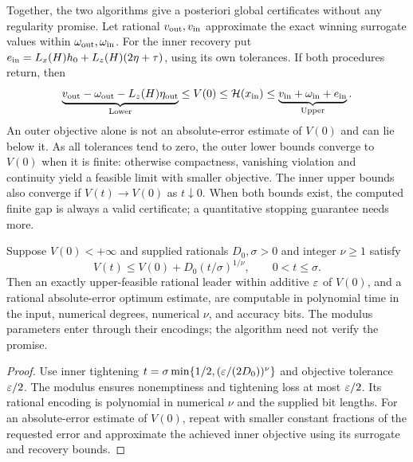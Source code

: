 Together, the two algorithms give a posteriori global certificates
without any regularity promise. Let rational $v_{\rm out},v_{\rm in}$ approximate
the exact winning surrogate values within $\omega_{\rm out},\omega_{\rm in}$.
For the inner recovery put
$e_{\rm in}=L_x(H)h_0+L_z(H)(2\eta+\tau)$, using its own tolerances.
If both procedures return, then
\begin{equation}\label{eq:accuracy-posterior}
 \underbrace{v_{\rm out}-\omega_{\rm out}-L_z(H)\eta_{\rm out}}_{\mathrm{Lower}}
 \le V(0)\le\mathcal H(x_{\rm in})\le
 \underbrace{v_{\rm in}+\omega_{\rm in}+e_{\rm in}}_{\mathrm{Upper}}.
\end{equation}
An outer objective
alone is not an absolute-error estimate of $V(0)$ and can lie below it.
As all tolerances tend to zero, the outer lower bounds converge to $V(0)$
when it is finite: otherwise compactness, vanishing violation and continuity
yield a feasible limit with smaller objective. The inner upper bounds
also converge if $V(t)\to V(0)$ as $t\downarrow0$. When both bounds
exist, the computed finite gap is always a valid certificate; a
quantitative stopping guarantee needs more.

\begin{corollary}
\label{cor:accuracy-tightening}
Suppose $V(0)<+\infty$ and supplied rationals $D_0,\sigma>0$ and
integer $\nu\ge1$ satisfy
\begin{equation}\label{eq:tightening-modulus}
 V(t)\le V(0)+D_0(t/\sigma)^{1/\nu},\qquad0<t\le\sigma.
\end{equation}
Then an exactly upper-feasible rational leader within additive $\varepsilon$
of $V(0)$, and a rational absolute-error optimum estimate, are computable
in polynomial time in the input, numerical degrees, numerical $\nu$,
and accuracy bits. The modulus parameters enter through their encodings;
the algorithm need not verify the promise.
\end{corollary}
\begin{proof}
Use inner tightening
$t=\sigma\min\{1/2,(\varepsilon/(2D_0))^\nu\}$ and objective tolerance
$\varepsilon/2$. The modulus ensures nonemptiness and tightening loss at
most $\varepsilon/2$. Its rational encoding is polynomial in numerical
$\nu$ and the supplied bit lengths. For an absolute-error estimate of
$V(0)$, repeat with smaller constant fractions of the requested error
and approximate the achieved inner objective using its surrogate and
recovery bounds.
\end{proof}

